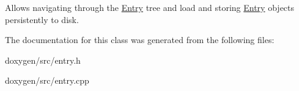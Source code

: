 Allows navigating through the \mbox{\hyperlink{class_entry}{Entry}} tree and load and storing \mbox{\hyperlink{class_entry}{Entry}} objects persistently to disk. 

The documentation for this class was generated from the following files\+:\begin{DoxyCompactItemize}
\item 
doxygen/src/entry.\+h\item 
doxygen/src/entry.\+cpp\end{DoxyCompactItemize}

